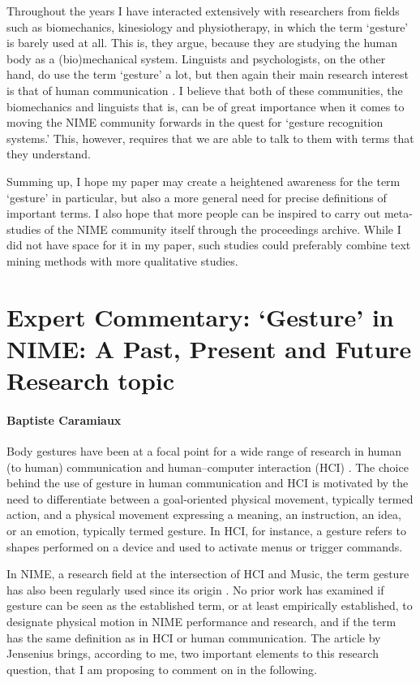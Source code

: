 Throughout the years I have interacted extensively with researchers from fields such as biomechanics, kinesiology and physiotherapy, in which the term `gesture' is barely used at all. This is, they argue, because they are studying the human body as a (bio)mechanical system. Linguists and psychologists, on the other hand, do use the term `gesture' a lot, but then again their main research interest is that of human communication \cite{Gritten:2006}. I believe that both of these communities, the biomechanics and linguists that is, can be of great importance when it comes to moving the NIME community forwards in the quest for `gesture recognition systems.' This, however, requires that we are able to talk to them with terms that they understand.

Summing up, I hope my paper may create a heightened awareness for the term `gesture' in particular, but also a more general need for precise definitions of important terms. I also hope that more people can be inspired to carry out meta-studies of the NIME community itself through the proceedings archive. While I did not have space for it in my paper,
such studies could preferably combine text mining methods with more
qualitative studies.

\section*{Expert Commentary: `Gesture' in NIME: A Past, Present and Future Research topic}

\paragraph{Baptiste Caramiaux}

Body gestures have been at a focal point for a wide range of research in human (to human) communication and human–computer interaction (HCI) \cite{Kendon:2004,Kurtenbach:1990}. The choice behind the use of gesture in human communication and HCI is motivated by the need to differentiate between a goal-oriented physical movement, typically termed action, and a physical movement expressing a meaning, an instruction, an idea, or an emotion, typically termed gesture. In HCI, for instance, a gesture refers to shapes performed on a device and used to activate menus or trigger commands. 

In NIME, a research field at the intersection of HCI and Music, the term gesture has also been regularly used since its origin  \cite{Cadoz:2000}. No prior work has examined if gesture can be seen as the established term, or at least empirically established, to designate physical motion in NIME performance and research, and if the term has the same definition as in HCI or human communication. The article by Jensenius brings, according to me, two important elements to this research question, that I am proposing to comment on in the following. 

